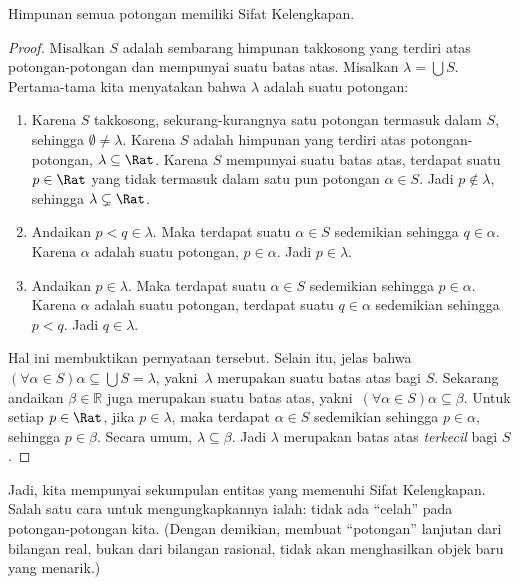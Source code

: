 \documentclass[../../../include/open-logic-section]{subfiles}
\begin{document}
\begin{thm}
Himpunan semua potongan memiliki Sifat Kelengkapan.
\end{thm}

\begin{proof}
Misalkan $S$ adalah sembarang himpunan takkosong yang terdiri atas potongan-potongan dan mempunyai
suatu batas atas. Misalkan $\lambda = \bigcup S$.
Pertama-tama kita menyatakan bahwa $\lambda$ adalah suatu potongan:
\begin{enumerate}
\item Karena $S$ takkosong, sekurang-kurangnya satu potongan
termasuk dalam $S$, sehingga $\emptyset \neq \lambda$. Karena $S$ adalah
himpunan yang terdiri atas potongan-potongan, $\lambda \subseteq \Rat$. Karena $S$ mempunyai suatu
batas atas, terdapat suatu $p \in \Rat$ yang tidak termasuk dalam satu pun
potongan $\alpha \in S$. Jadi $p\notin \lambda$, sehingga $\lambda \subsetneq
\Rat$.
\item Andaikan $p < q \in \lambda$. Maka terdapat suatu $\alpha \in S$
sedemikian sehingga $q \in \alpha$. Karena $\alpha$ adalah suatu potongan,
$p \in \alpha$. Jadi $p \in \lambda$.
\item Andaikan $p \in \lambda$. Maka terdapat suatu $\alpha \in S$
sedemikian sehingga $p \in \alpha$. Karena $\alpha$ adalah suatu potongan,
terdapat suatu $q \in \alpha$ sedemikian sehingga $p < q$. Jadi $q \in
\lambda$.
\end{enumerate}
Hal ini membuktikan pernyataan tersebut. Selain itu, jelas bahwa $(\forall \alpha \in S)\alpha
\subseteq \bigcup S = \lambda$, yakni\ $\lambda$ merupakan suatu batas atas bagi $S$. Sekarang andaikan $\beta \in \mathbb{R}$ juga merupakan suatu batas atas, yakni\ $(\forall \alpha \in S)\alpha \subseteq \beta$. Untuk setiap $p \in \Rat$, jika $p \in \lambda$, maka terdapat $\alpha \in S$ sedemikian sehingga $p \in \alpha$, sehingga $p \in \beta$. Secara umum, $\lambda \subseteq \beta$. Jadi $\lambda$ merupakan batas atas \emph{terkecil} bagi $S$.
\end{proof}

Jadi, kita mempunyai sekumpulan entitas yang memenuhi Sifat Kelengkapan.
Salah satu cara untuk mengungkapkannya ialah: tidak ada ``celah'' pada
potongan-potongan kita. (Dengan demikian, membuat ``potongan'' lanjutan dari
bilangan real, bukan dari bilangan rasional, tidak akan menghasilkan objek
baru yang menarik.)
\end{document}
